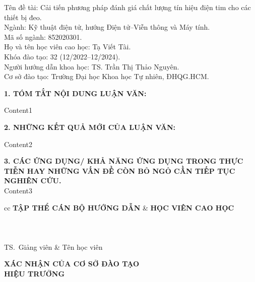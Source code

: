 \begin{flushleft}
	Tên đề tài: Cải tiến phương pháp đánh giá chất lượng tín hiệu điện tim cho các thiết bị đeo. \\
	Ngành: Kỹ thuật điện tử, hướng Điện tử--Viễn thông và Máy tính. \\
	Mã số ngành: 852020301. \\
	Họ và tên học viên cao học: Tạ Viết Tài. \\
	Khóa đào tạo: 32 (12/2022--12/2024). \\
	Người hướng dẫn khoa học: TS. Trần Thị Thảo Nguyên.\\
	Cơ sở đào tạo: Trường Đại học Khoa học Tự nhiên, ĐHQG.HCM. \\
\end{flushleft}

\textbf{1. TÓM TẮT NỘI DUNG LUẬN VĂN:}

Content1

\textbf{2. NHỮNG KẾT QUẢ MỚI CỦA LUẬN VĂN:}

Content2

\textbf{3. CÁC ỨNG DỤNG/ KHẢ NĂNG ỨNG DỤNG TRONG THỰC TIỄN HAY NHỮNG VẤN ĐỀ CÒN BỎ NGỎ CẦN TIẾP TỤC NGHIÊN CỨU.}\\

Content3


\vspace{1.5em}
\begin{tblr}{cc}
	\centering
	\textbf{TẬP THỂ CÁN BỘ HƯỚNG DẪN} & \textbf{\hspace{5.0em}HỌC VIÊN CAO HỌC} \\
	\\
	\\
	\\
	TS.~Giảng viên                   & \hspace{5.0em} Tên học viên
\end{tblr}

\vspace{2.5em}
\begin{center}
	\textbf{XÁC NHẬN CỦA CƠ SỞ ĐÀO TẠO} \\
	\textbf{HIỆU TRƯỞNG}
\end{center}